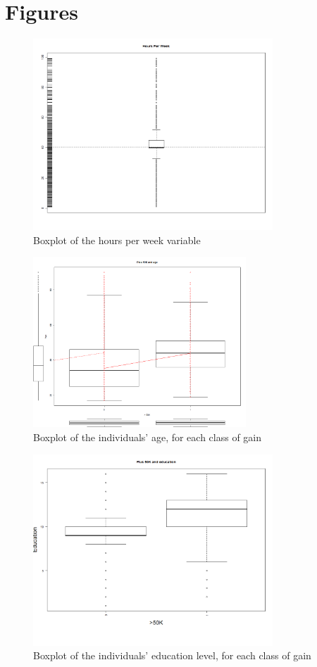 \documentclass[a4paper]{llncs}
\begin{document}
\clearpage
\section{Figures}

\begin{figure}
\centering
\includegraphics[width=9cm]{boxplot_hours_per_week.png}
\caption{Boxplot of the hours per week variable}
\label{fig:box_hours}
\end{figure}

\begin{figure}
\centering
\includegraphics[width=8cm]{plot_plus_50_age.png}
\caption{Boxplot of the individuals' age, for each class of gain}
\label{fig:age_plus50}
\end{figure}

\begin{figure}
\centering
\includegraphics[width=9cm]{plot_plus_50_education_num.png}
\caption{Boxplot of the individuals' education level, for each class of gain}
\label{fig:education_plus50}
\end{figure}
\end{document}

